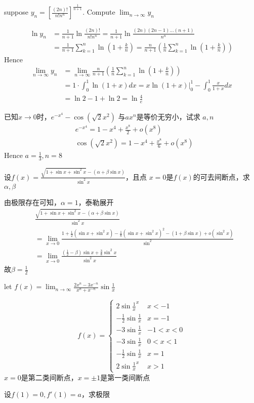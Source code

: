 \documentclass{article}
\begin{document}
\begin{examplle}[]
suppose \(\displaystyle y_n=\left[\frac{(2n)!}{n!n^n}\right]^{\frac{1}{n+1}}\). Compute
\(\lim_{n\to\infty}y_n\)

\begin{align*}
\ln y_n&=\frac{1}{n+1}\ln\frac{(2n)!}{n!n^n}=
\frac{1}{n+1}\ln\frac{(2n)(2n-1)\dots(n+1)}{n^n}\\
&=\frac{1}{n+1}\sum_{k=1}^n\ln(1+\frac{k}{n})=
\frac{n}{n+1}\left(
\frac{1}{n}\sum_{k=1}^n\ln(1+\frac{k}{n})
\right)
\end{align*}
Hence
\begin{align*}
\lim_{n\to\infty}y_n&=\lim_{n\to\infty}\frac{n}{n+1}\left(
\frac{1}{n}\sum_{k=1}^n\ln(1+\frac{k}{n})
\right)\\
&=1\cdot\int_0^1\ln(1+x)dx=
x\ln(1+x)\rvert_0^1-\int_0^1\frac{x}{1+x}dx\\
&=\ln2-1+\ln2=\ln\frac{4}{e}
\end{align*}
\end{examplle}

\begin{examplle}[]
已知\(x\to0\)时，\(e^{-x^4}-\cos(\sqrt{2}x^2)\) 与\(ax^n\)是等价无穷小，试求
\(a,n\)
\begin{align*}
&e^{-x^4}=1-x^4+\frac{x^8}{2}+o(x^8)\\
&\cos(\sqrt{2}x^2)=1-x^4+\frac{x^8}{6}+o(x^8)
\end{align*}
Hence \(a=\frac{1}{3},n=8\)
\end{examplle}

\begin{examplle}[]
设\(\displaystyle f(x)=\frac{\sqrt{1+\sin x+\sin^2x}-(\alpha+\beta\sin x)}{\sin^2x}\)，且点
\(x=0\)是\(f(x)\)的可去间断点，求\(\alpha,\beta\)

由极限存在可知，\(\alpha=1\)，泰勒展开
\begin{align*}
&\frac{\sqrt{1+\sin x+\sin^2x}-(\alpha+\beta\sin x)}{\sin^2x}\\
&=\lim_{x\to0}\frac{1+\frac{1}{2}(\sin x+\sin^2x)-\frac{1}{8}(\sin x+\sin^2x)^2-(1+\beta\sin x)
+o(\sin^2x)}{\sin^2}\\
&=\lim_{x\to0}\frac{(\frac{1}{2}-\beta)\sin x+\frac{3}{8}\sin^2x}{\sin^2x}
\end{align*}
故\(\beta=\frac{1}{2}\)
\end{examplle}

\begin{examplle}[]
let \(f(x)=\lim_{n\to\infty}\frac{2x^n-3x^{-n}}{x^n+x^{-n}}\sin\frac{1}{x}\)

\begin{equation*}
f(x)=
\begin{cases}
2\sin\frac{1}{x}^x&x<-1\\
-\frac{1}{2}\sin\frac{1}{x}&x=-1\\
-3\sin\frac{1}{x}&-1<x<0\\
-3\sin\frac{1}{x}&0<x<1\\
-\frac{1}{2}\sin\frac{1}{x}&x=1\\
2\sin\frac{1}{x}^x&x>1
\end{cases}
\end{equation*}
\(x=0\)是第二类间断点，\(x=\pm1\)是第一类间断点
\end{examplle}

\begin{examplle}[]
设\(f(1)=0,f'(1)=a\)，求极限
\end{examplle}
\end{document}
